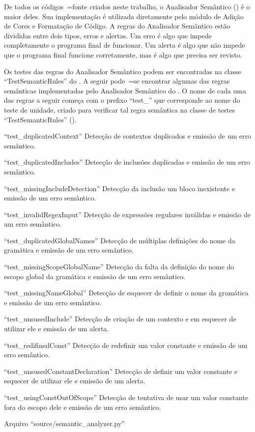 De todos os códigos~=fonte criados neste trabalho,
o Analisador Semântico () é o maior deles.
Sua implementação é utilizada diretamente pelo módulo de Adição de Cores e
Formatação de Código.
A regras do Analisador Semântico estão divididas entre dois tipos,
erros e
alertas.
Um erro é algo que impede completamente o programa final de funcionar.
Um alerta é algo que não impede que o programa final funcione corretamente,
mas é algo que precisa ser revisto.

Os testes das regras do Analisador Semântico podem ser encontradas na classe ``TestSemanticRules'' do .
A seguir pode~=se encontrar algumas das regras semânticas implementadas pelo Analisador Semântico do .
O nome de cada uma das regras a seguir começa com o prefixo ``test\_'' que corresponde ao nome do teste de unidade,
criado para verificar tal regra semântica na classe de testes ``TestSemanticRules'' ().
\begin{enumerateoptional}[.]
\item[``test\_duplicatedContext''] Detecção de contextos duplicados e
emissão de um erro semântico.
\item[``test\_duplicatedIncludes''] Detecção de inclusões duplicadas  e
emissão de um erro semântico.
\item[``test\_missingIncludeDetection''] Detecção da inclusão um bloco inexistente e
emissão de um erro semântico.
\item[``test\_invalidRegexInput''] Detecção de expressões regulares inválidas e
emissão de um erro semântico.
\item[``test\_duplicatedGlobalNames''] Detecção de múltiplas definições do nome da gramática e
emissão de um erro semântico.
\item[``test\_missingScopeGlobalName''] Detecção da falta da definição do nome do escopo global da gramática e
emissão de um erro semântico.
\item[``test\_missingNameGlobal''] Detecção de esquecer de definir o nome da gramática e
emissão de um erro semântico.
\item[``test\_unsusedInclude''] Detecção de criação de um contexto e
em esquecer de utilizar ele e
emissão de um alerta.
\item[``test\_redifinedConst''] Detecção de redefinir um valor constante e
emissão de um erro semântico.
\item[``test\_unsusedConstantDeclaration''] Detecção de definir um valor constante e esquecer de utilizar ele e
emissão de um alerta.
\item[``test\_usingConstOutOfScope''] Detecção de tentativa de usar um valor constante fora do escopo dele e
emissão de um erro semântico.
\end{enumerateoptional}%
\begin{code}
\caption{Arquivo ``source/semantic\_analyzer.py''}
\label{semanticAnalyzerPy}
\inputminted{python3}{../source/semantic_analyzer.py}
\end{code}


